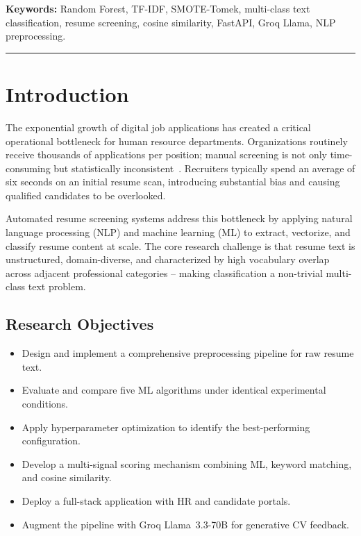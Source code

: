 \documentclass[10pt,twocolumn]{article}
\begin{document}
\noindent\textbf{Keywords:} Random Forest, TF-IDF, SMOTE-Tomek, multi-class text classification, resume screening, cosine similarity, FastAPI, Groq Llama, NLP preprocessing.

\vspace{6pt}
\noindent\textcolor{primary}{\rule{\linewidth}{0.4pt}}
\vspace{4pt}

\section{Introduction}

The exponential growth of digital job applications has created a critical operational bottleneck for human resource departments. Organizations routinely receive thousands of applications per position; manual screening is not only time-consuming but statistically inconsistent~\cite{garcia2023}. Recruiters typically spend an average of six seconds on an initial resume scan, introducing substantial bias and causing qualified candidates to be overlooked.

Automated resume screening systems address this bottleneck by applying natural language processing (NLP) and machine learning (ML) to extract, vectorize, and classify resume content at scale. The core research challenge is that resume text is unstructured, domain-diverse, and characterized by high vocabulary overlap across adjacent professional categories -- making classification a non-trivial multi-class text problem.

\subsection{Research Objectives}
\begin{itemize}
  \item Design and implement a comprehensive preprocessing pipeline for raw resume text.
  \item Evaluate and compare five ML algorithms under identical experimental conditions.
  \item Apply hyperparameter optimization to identify the best-performing configuration.
  \item Develop a multi-signal scoring mechanism combining ML, keyword matching, and cosine similarity.
  \item Deploy a full-stack application with HR and candidate portals.
  \item Augment the pipeline with Groq Llama~3.3-70B for generative CV feedback.
\end{itemize}
\end{document}
